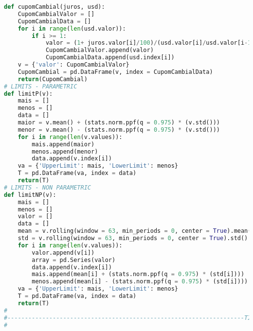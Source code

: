 \begin{lstlisting}[language=Python]
def cupomCambial(juros, usd):
    CupomCambialValor = []
    CupomCambialData = []
    for i in range(len(usd.valor)):
        if i >= 1:
            valor = (1+ juros.valor[i]/100)/(usd.valor[i]/usd.valor[i-1])-1
            CupomCambialValor.append(valor)
            CupomCambialData.append(usd.index[i])
    v = {'valor': CupomCambialValor}        
    CupomCambial = pd.DataFrame(v, index = CupomCambialData)
    return(CupomCambial)
# LIMITS - PARAMETRIC
def limitP(v):
    mais = []
    menos = []
    data = []
    maior = v.mean() + (stats.norm.ppf(q = 0.975) * (v.std()))
    menor = v.mean() - (stats.norm.ppf(q = 0.975) * (v.std()))
    for i in range(len(v.values)):
        mais.append(maior)
        menos.append(menor)
        data.append(v.index[i])
    va = {'UpperLimit': mais, 'LowerLimit': menos}        
    T = pd.DataFrame(va, index = data)
    return(T)
# LIMITS - NON PARAMETRIC
def limitNP(v):
    mais = []
    menos = []
    valor = []
    data = []
    mean = v.rolling(window = 63, min_periods = 0, center = True).mean()
    std = v.rolling(window = 63, min_periods = 0, center = True).std()
    for i in range(len(v.values)):
        valor.append(v[i])
        array = pd.Series(valor)
        data.append(v.index[i])
        mais.append(mean[i] + (stats.norm.ppf(q = 0.975) * (std[i])))
        menos.append(mean[i] - (stats.norm.ppf(q = 0.975) * (std[i])))
    va = {'UpperLimit': mais, 'LowerLimit': menos}        
    T = pd.DataFrame(va, index = data)
    return(T)
#
#--------------------------------------------------------------------TIME SERIES
#


\end{lstlisting}